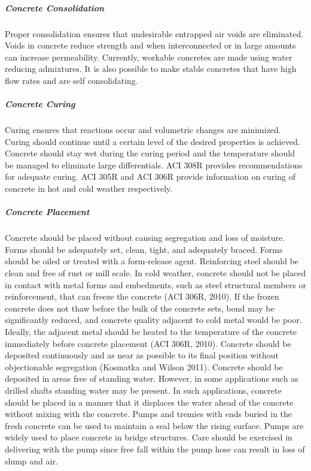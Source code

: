 \subparagraph{Concrete Consolidation}
Proper consolidation ensures that undesirable entrapped air voids are eliminated. Voids in concrete reduce strength and when interconnected or in large amounts can increase permeability. Currently, workable concretes are made using water reducing admixtures. It is also possible to make stable concretes that have high flow rates and are self consolidating.

\subparagraph{Concrete Curing}

Curing ensures that reactions occur and volumetric changes are minimized. Curing should continue until a certain level of the desired properties is achieved. Concrete should stay wet during the curing period and the temperature should be managed to eliminate large differentials. ACI 308R provides recommendations for adequate curing. ACI 305R and ACI 306R provide information on curing of concrete in hot and cold weather respectively.

\subparagraph{Concrete Placement}
Concrete should be placed without causing segregation and loss of moisture. Forms should be adequately set, clean, tight, and adequately braced. Forms should be oiled or treated with a form-release agent. Reinforcing steel should be clean and free of rust or mill scale. In cold weather, concrete should not be placed in contact with metal forms and embedments, such as steel structural members or reinforcement, that can freeze the concrete (ACI 306R, 2010). If the frozen concrete does not thaw before the bulk of the concrete sets, bond may be significantly reduced, and concrete quality adjacent to cold metal would be poor. Ideally, the adjacent metal should be heated to the temperature of the concrete immediately before concrete placement (ACI 306R, 2010). Concrete should be deposited continuously and as near as possible to its final position without objectionable segregation (Kosmatka and Wilson 2011). Concrete should be deposited in areas free of standing water. However, in some applications such as drilled shafts standing water may be present. In such applications, concrete should be placed in a manner that it displaces the water ahead of the concrete without mixing with the concrete. Pumps and tremies with ends buried in the fresh concrete can be used to maintain a seal below the rising surface. Pumps are widely used to place concrete in bridge structures. Care should be exercised in delivering with the pump since free fall within the pump hose can result in loss of slump and air.


